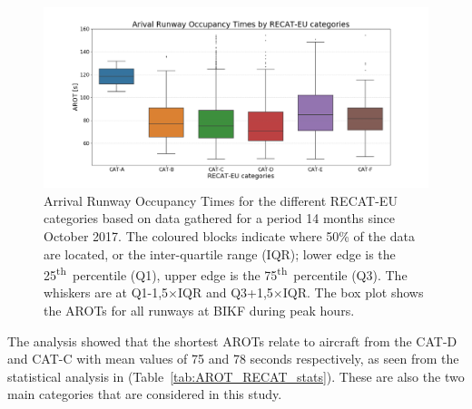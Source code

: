 \begin{figure}[h]
    \centering
    \includegraphics[width=1\textwidth]{graphics/fig_RECAT_AROTs_boxplot.png}
    \caption[AROTs box-plot for RECAT-EU categories, all runways]{Arrival Runway Occupancy Times for the different RECAT-EU categories based on data gathered for a period 14 months since October 2017. The coloured blocks indicate where 50\% of the data are located, or the inter-quartile range (IQR); lower edge is the 25\textsuperscript{th}~percentile (Q1), upper edge is the 75\textsuperscript{th}~percentile (Q3). The whiskers are at Q1-1,5$\times$IQR and Q3+1,5$\times$IQR.  The box plot shows the AROTs for all runways at BIKF during peak hours.}
    \label{fig:RECAT_AROTs_boxplot}
\end{figure}

The analysis showed that the shortest AROTs relate to aircraft from the CAT-D and CAT-C with mean values of 75 and 78 seconds respectively, as seen from the statistical analysis in (Table~\ref{tab:AROT_RECAT_stats}). These are also the two main categories that are considered in this study.

